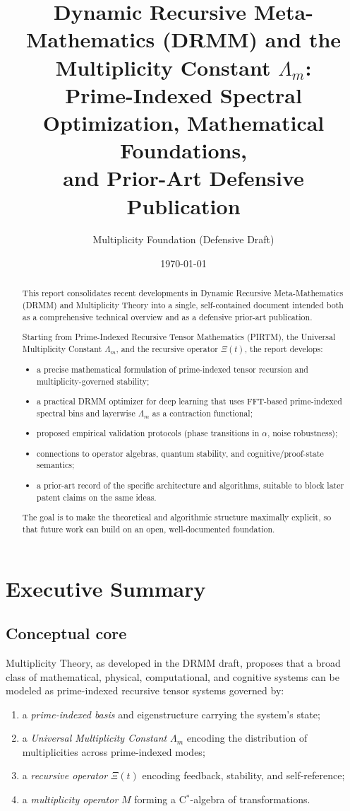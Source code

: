 \documentclass[11pt]{article}
\title{%
Dynamic Recursive Meta-Mathematics (DRMM) and the Multiplicity Constant $\Lambda_m$:\\
Prime-Indexed Spectral Optimization, Mathematical Foundations,\\
and Prior-Art Defensive Publication
}
\author{Multiplicity Foundation (Defensive Draft)}
\date{\today}
\begin{document}
\maketitle

\begin{abstract}
This report consolidates recent developments in Dynamic Recursive Meta-Mathematics (DRMM) and Multiplicity Theory into a single, self-contained document intended both as a comprehensive technical overview and as a defensive prior-art publication.

Starting from Prime-Indexed Recursive Tensor Mathematics (PIRTM), the Universal Multiplicity Constant $\Lambda_m$, and the recursive operator $\Xi(t)$, the report develops:
\begin{itemize}[leftmargin=*]
  \item a precise mathematical formulation of prime-indexed tensor recursion and multiplicity-governed stability;
  \item a practical DRMM optimizer for deep learning that uses FFT-based prime-indexed spectral bins and layerwise $\Lambda_m$ as a contraction functional;
  \item proposed empirical validation protocols (phase transitions in $\alpha$, noise robustness);
  \item connections to operator algebras, quantum stability, and cognitive/proof-state semantics;
  \item a prior-art record of the specific architecture and algorithms, suitable to block later patent claims on the same ideas.
\end{itemize}
The goal is to make the theoretical and algorithmic structure maximally explicit, so that future work can build on an open, well-documented foundation.
\end{abstract}

\tableofcontents

\section{Executive Summary}

\subsection{Conceptual core}

Multiplicity Theory, as developed in the DRMM draft, proposes that a broad class of mathematical, physical, computational, and cognitive systems can be modeled as prime-indexed recursive tensor systems governed by:
\begin{enumerate}[label=(\roman*),leftmargin=*]
  \item a \emph{prime-indexed basis} and eigenstructure carrying the system's state;
  \item a \emph{Universal Multiplicity Constant} $\Lambda_m$ encoding the distribution of multiplicities across prime-indexed modes;
  \item a \emph{recursive operator} $\Xi(t)$ encoding feedback, stability, and self-reference;
  \item a \emph{multiplicity operator} $M$ forming a C$^*$-algebra of transformations.
\end{enumerate}
\end{document}
